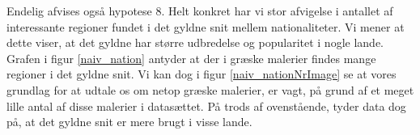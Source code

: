 {Endelig afvises også hypotese 8. Helt konkret har vi stor afvigelse i
antallet af interessante regioner fundet i det gyldne snit mellem
nationaliteter. Vi mener at dette viser, at det gyldne har større
udbredelse og popularitet i nogle lande. Grafen i figur
\ref{naiv_nation} antyder at der i græske malerier findes mange regioner
i det gyldne snit. Vi kan dog i figur \ref{naiv_nationNrImage} se at
vores grundlag for at udtale os om netop græske malerier, er vagt, på
grund af et meget lille antal af disse malerier i datasættet. På trods
af ovenstående, tyder data dog på, at det gyldne snit er mere brugt i
visse lande.

}

